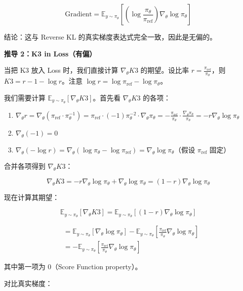 \[
\mathrm{Gradient}
=\mathbb{E}_{y\sim\pi_\theta}\left[
\left(\log\frac{\pi_\theta}{\pi_{\mathrm{ref}}}\right)
\nabla_\theta\log\pi_\theta
\right]
\]

结论：这与 Reverse KL 的真实梯度表达式完全一致，因此是无偏的。

\textbf{推导 2：K3 in Loss（有偏）}

当把 K3 放入 Loss 时，我们直接计算 \(\nabla_\theta K3\) 的期望。设比率 \(r=\frac{\pi_{\mathrm{ref}}}{\pi_\theta}\)，则 \(K3=r-1-\log r\)。注意 \(\log r=\log\pi_{\mathrm{ref}}-\log\pi_\theta\)。

我们需要计算 \(\mathbb{E}_{y\sim\pi_\theta}[\nabla_\theta K3]\)。首先看 \(\nabla_\theta K3\) 的各项：

\begin{enumerate}
\def\labelenumi{\arabic{enumi}.}
\tightlist
\item
  \(\nabla_\theta r=\nabla_\theta(\pi_{\mathrm{ref}}\cdot\pi_\theta^{-1})=\pi_{\mathrm{ref}}\cdot(-1)\pi_\theta^{-2}\cdot\nabla_\theta\pi_\theta=-\frac{\pi_{\mathrm{ref}}}{\pi_\theta}\cdot\frac{\nabla_\theta\pi_\theta}{\pi_\theta}=-r\nabla_\theta\log\pi_\theta\)
\item
  \(\nabla_\theta(-1)=0\)
\item
  \(\nabla_\theta(-\log r)=\nabla_\theta(\log\pi_\theta-\log\pi_{\mathrm{ref}})=\nabla_\theta\log\pi_\theta\)（假设 \(\pi_{\mathrm{ref}}\) 固定）
\end{enumerate}

合并各项得到 \(\nabla_\theta K3\)：

\[
\nabla_\theta K3
=-r\nabla_\theta\log\pi_\theta+\nabla_\theta\log\pi_\theta
=(1-r)\nabla_\theta\log\pi_\theta
\]

现在计算其期望：

\[
\mathbb{E}_{y\sim\pi_\theta}[\nabla_\theta K3]
=\mathbb{E}_{y\sim\pi_\theta}\left[(1-r)\nabla_\theta\log\pi_\theta\right]
\]

\[
\begin{aligned}
&=\mathbb{E}_{y\sim\pi_\theta}\left[\nabla_\theta\log\pi_\theta\right]
-\mathbb{E}_{y\sim\pi_\theta}\left[
\frac{\pi_{\mathrm{ref}}}{\pi_\theta}\nabla_\theta\log\pi_\theta
\right] \\
&=-\mathbb{E}_{y\sim\pi_\theta}\left[
\frac{\pi_{\mathrm{ref}}}{\pi_\theta}\nabla_\theta\log\pi_\theta
\right]
\end{aligned}
\]

其中第一项为 \(0\)（Score Function property）。

对比真实梯度：

